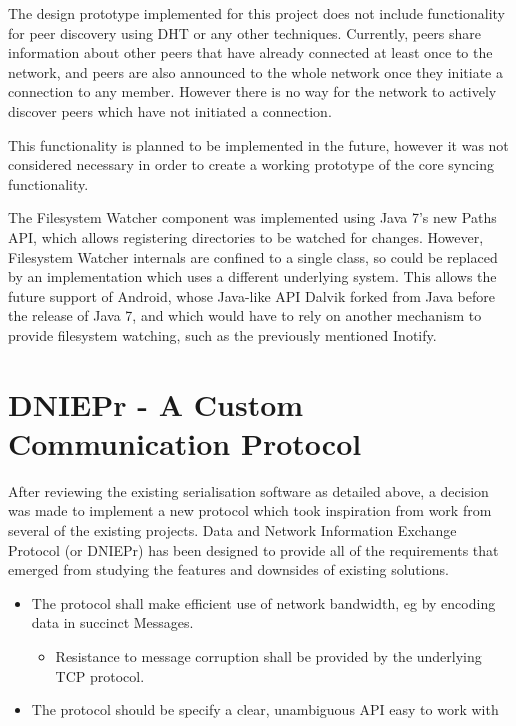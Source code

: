 \documentclass[12pt,a4paper,]{adreport}
\begin{document}
The design prototype implemented for this project does not include
functionality for peer discovery using DHT or any other techniques.
Currently, peers share information about other peers that have already
connected at least once to the network, and peers are also announced to
the whole network once they initiate a connection to any member. However
there is no way for the network to actively discover peers which have
not initiated a connection.

This functionality is planned to be implemented in the future, however
it was not considered necessary in order to create a working prototype
of the core syncing functionality.

The Filesystem Watcher component was implemented using Java 7's new
Paths API, which allows registering directories to be watched for
changes. However, Filesystem Watcher internals are confined to a single
class, so could be replaced by an implementation which uses a different
underlying system. This allows the future support of Android, whose
Java-like API Dalvik forked from Java before the release of Java 7, and
which would have to rely on another mechanism to provide filesystem
watching, such as the previously mentioned Inotify.

\section{DNIEPr - A Custom Communication
Protocol}\label{dniepr---a-custom-communication-protocol}

After reviewing the existing serialisation software as detailed above, a
decision was made to implement a new protocol which took inspiration
from work from several of the existing projects. Data and Network
Information Exchange Protocol (or DNIEPr) has been designed to provide
all of the requirements that emerged from studying the features and
downsides of existing solutions.

\begin{itemize}
\itemsep1pt\parskip0pt
\item
  The protocol shall make efficient use of network bandwidth, eg by
  encoding data in succinct Messages.

  \begin{itemize}
  \itemsep1pt\parskip0pt
  \item
    Resistance to message corruption shall be provided by the underlying
    TCP protocol.
  \end{itemize}
\item
  The protocol should be specify a clear, unambiguous API easy to work
  with
\end{itemize}
\end{document}
